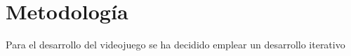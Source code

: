 \chapter{Metodología}

Para el desarrollo del videojuego se ha decidido emplear un desarrollo iterativo
\subsection{}



\subsection{}



\subsection{}



\subsection{}

